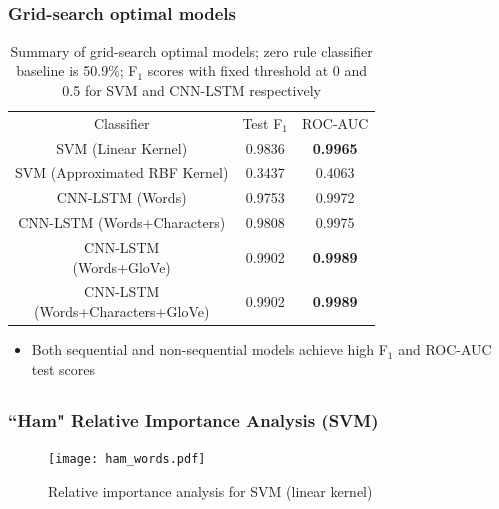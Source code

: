 \documentclass{beamer}
\begin{document}
\subsection{}
\begin{framefont}{\footnotesize}
	\begin{frame}
		\frametitle{Grid-search optimal models}
		\begin{table}
			\centering
			\captionsetup{justification=centering}
			\bgroup
			\def\arraystretch{1.5}
			\begin{tabular}{|c|c|c|} \hline
				Classifier & Test F$_1$ & ROC-AUC \\ \hhline{|=|=|=|}
				SVM (Linear Kernel) & 0.9836 & \textbf{0.9965} \\ \hline
				SVM (Approximated RBF Kernel) & 0.3437 & 0.4063 \\ \hline
				CNN-LSTM (Words) & 0.9753 & 0.9972 \\ \hline
				CNN-LSTM (Words+Characters) & 0.9808 & 0.9975 \\ \hline
				\makecell{CNN-LSTM \\(Words+GloVe)} & 0.9902 & \textbf{0.9989} \\ \hline 
				\makecell{CNN-LSTM \\(Words+Characters+GloVe)} & 0.9902 & \textbf{0.9989} \\ \hline
			\end{tabular}
			\egroup
			\caption{Summary of grid-search optimal models; zero rule classifier baseline is 50.9\%; F$_1$ scores with fixed threshold at 0 and 0.5 for SVM and CNN-LSTM respectively}
		\end{table}
		\vspace{-10pt}
		\begin{itemize}
			\item Both sequential and non-sequential models achieve high F$_1$ and ROC-AUC test scores
		\end{itemize}
	\end{frame}
\end{framefont}

\subsection{}
\begin{framefont}{\footnotesize}
	\begin{frame}
		\frametitle{``Ham" Relative Importance Analysis (SVM)}
		\centering
		\begin{figure}
			\captionsetup{justification=centering}
			\texttt{[image: ham\_words.pdf]}
			\caption{Relative importance analysis for SVM (linear kernel)}
		\end{figure}
	\end{frame}
\end{framefont}
\end{document}
